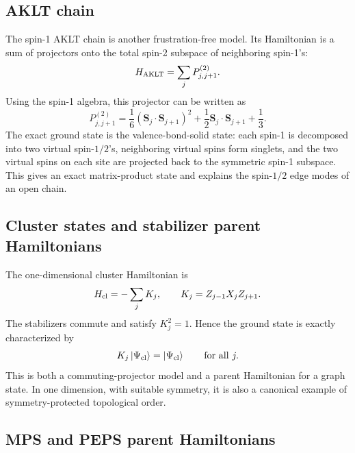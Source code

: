 \subsection{AKLT chain}

The spin-1 AKLT chain is another frustration-free model.  Its Hamiltonian is a sum of projectors onto the total spin-2 subspace of neighboring spin-1's:
\begin{equation}
\label{eq:conclusion-aklt-hamiltonian}
    H_{\rm AKLT}
    =
    \sum_j P_{j,j+1}^{(2)}.
\end{equation}
Using the spin-1 algebra, this projector can be written as
\begin{equation}
\label{eq:conclusion-aklt-projector-polynomial}
    P_{j,j+1}^{(2)}
    =
    \frac16(\bm S_j\cdot\bm S_{j+1})^2
    +\frac12\bm S_j\cdot\bm S_{j+1}
    +\frac13 .
\end{equation}
The exact ground state is the valence-bond-solid state: each spin-1 is decomposed into two virtual spin-\(1/2\)'s, neighboring virtual spins form singlets, and the two virtual spins on each site are projected back to the symmetric spin-1 subspace.  This gives an exact matrix-product state and explains the spin-\(1/2\) edge modes of an open chain.

\subsection{Cluster states and stabilizer parent Hamiltonians}

The one-dimensional cluster Hamiltonian is
\begin{equation}
\label{eq:conclusion-cluster-hamiltonian}
    H_{\rm cl}
    =
    -\sum_j K_j,
    \qquad
    K_j=Z_{j-1}X_jZ_{j+1}.
\end{equation}
The stabilizers commute and satisfy \(K_j^2=1\).  Hence the ground state is exactly characterized by
\begin{equation}
\label{eq:conclusion-cluster-stabilizer-condition}
    K_j\left|\Psi_{\rm cl}\right\rangle=\left|\Psi_{\rm cl}\right\rangle
    \qquad
    \text{for all }j.
\end{equation}
This is both a commuting-projector model and a parent Hamiltonian for a graph state.  In one dimension, with suitable symmetry, it is also a canonical example of symmetry-protected topological order.

\subsection{MPS and PEPS parent Hamiltonians}

